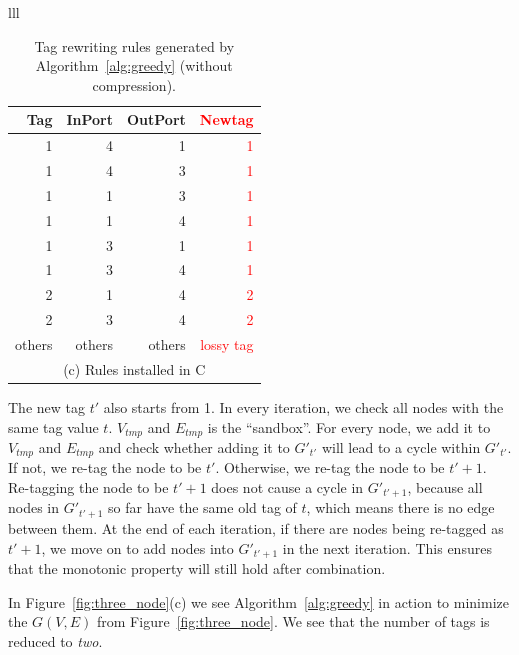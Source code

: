 \begin{table}[t]
{\begin{tabular}{lll}
		\begin{tabular}{|r|r|r|r|}
			\hline
			Tag&  InPort& OutPort & \textcolor{red}{Newtag} \\
			\hline
			\hline
			1 & 4 & 1 & \textcolor{red}{1} \\
			\hline
			1 & 4 & 3 & \textcolor{red}{1} \\
			\hline
			1 & 1 & 3 & \textcolor{red}{1} \\
			\hline
			1 & 1 & 4 & \textcolor{red}{1} \\
			\hline
			1 & 3 & 1 & \textcolor{red}{1} \\
			\hline
			1 & 3 & 4 & \textcolor{red}{1} \\
			\hline
			2 & 1 & 4 & \textcolor{red}{2} \\
			\hline
			2 & 3 & 4 & \textcolor{red}{2} \\
			\hline
			others & others & others & \textcolor{red}{lossy tag} \\
			\hline
			\multicolumn{4}{c}{(c) Rules installed in C} \\
		\end{tabular}
		
	\end{tabular}
}
	\caption{Tag rewriting rules generated by Algorithm~\ref{alg:greedy} (without compression).}
	\vspace{-2em}
	\label{table:tagging_table2}
\end{table}

The new tag $t'$ also starts from 1. In every iteration, we check all nodes with
the same tag value $t$. $V_{tmp}$ and $E_{tmp}$ is the ``sandbox''. For every
node, we add it to $V_{tmp}$ and $E_{tmp}$ and check whether adding it to
$G'_{t'}$ will lead to a cycle within $G'_{t'}$. If not, we re-tag the node to
be $t'$. Otherwise, we re-tag the node to be $t'+1$.  Re-tagging the node to be
$t'+1$ does not cause a cycle in $G'_{t'+1}$, because all nodes in $G'_{t'+1}$
so far have the same old tag of $t$, which means there is no edge between them.
At the end of each iteration, if there are nodes being re-tagged as $t'+1$, we
move on to add nodes into $G'_{t'+1}$ in the next iteration.  This ensures that
the monotonic property will still hold after combination.

In Figure~\ref{fig:three_node}(c) we see Algorithm~\ref{alg:greedy} in action to
minimize the $G(V,E)$ from Figure~\ref{fig:three_node}. We see that the number
of tags is reduced to {\em two}.

